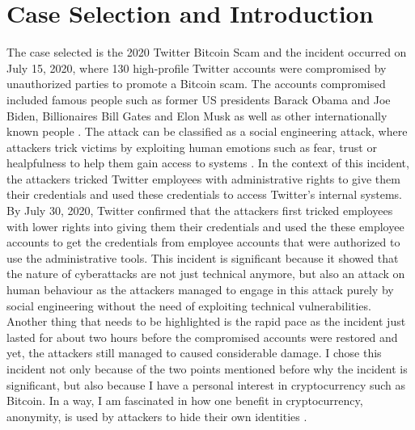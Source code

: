 \chapter{Case Selection and Introduction}
The case selected is the 2020 Twitter Bitcoin Scam and the incident occurred on July 15, 2020, where 130 high-profile Twitter accounts were compromised by unauthorized parties to promote a Bitcoin scam. The accounts compromised included famous people such as former US presidents Barack Obama and Joe Biden, Billionaires Bill Gates and Elon Musk as well as other internationally known people \cite{twitterhack, isacablog}.
\newline
The attack can be classified as a social engineering attack, where attackers trick victims by exploiting human emotions such as fear, trust or healpfulness to help them gain access to systems \cite{erbschloe2004trojans}. 
\newline
In the context of this incident, the attackers tricked Twitter employees with administrative rights to give them their credentials and used these credentials to access Twitter's internal systems.
\newline 
By July 30, 2020, Twitter confirmed that the attackers first tricked employees with lower rights into giving them their credentials and used the these employee accounts to get the credentials from employee accounts that were authorized to use the administrative tools.
\newline
This incident is significant because it showed that the nature of cyberattacks are not just technical anymore, but also an attack on human behaviour as the attackers managed to engage in this attack purely by social engineering without the need of exploiting technical vulnerabilities. 
\newline
Another thing that needs to be highlighted is the rapid pace as the incident just lasted for about two hours before the compromised accounts were restored and yet, the attackers still managed to caused considerable damage.
\newline
I chose this incident not only because of the two points mentioned before why the incident is significant, but also because I have a personal interest in cryptocurrency such as Bitcoin. In a way, I am fascinated in how one benefit in cryptocurrency, anonymity, is used by attackers to hide their own identities \cite{kethineni2020rise}.